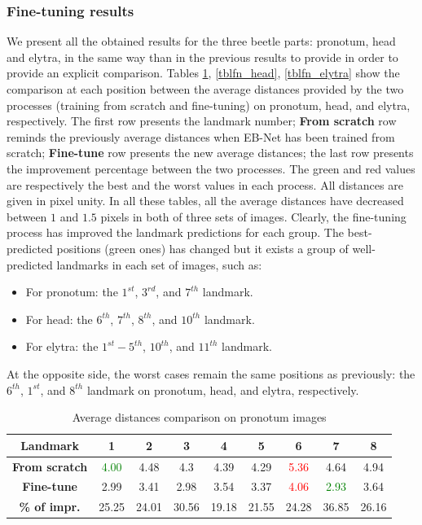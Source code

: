 \documentclass[review]{elsarticle}
\begin{document}
\subsubsection{Fine-tuning results}

We present all the obtained results for the three beetle parts:
pronotum, head and elytra, in the same way than in the previous
results to provide in order to provide an explicit comparison. Tables
\ref{tblfn_pronotum}, \ref{tblfn_head}, \ref{tblfn_elytra} show the
comparison at each position between the average distances provided by
the two processes (training from scratch and fine-tuning) on pronotum,
head, and elytra, respectively.  The first row presents the landmark
number; \textbf{From scratch} row reminds the previously average
distances when EB-Net has been trained from scratch; \textbf{Fine-tune} row
presents the new average distances; the last row presents the
improvement percentage between the two processes. The green and red
values are respectively the best and the worst values in each
process. All distances are given in pixel unity. In all these tables,
all the average distances have decreased between $1$ and $1.5$ pixels
in both of three sets of images. Clearly, the fine-tuning process has
improved the landmark predictions for each group. The best-predicted positions (green
ones) has changed but it exists a group of
well-predicted landmarks in each set of images, such as:


\begin{itemize}
	\item For pronotum: the $1^{st}$, $3^{rd}$, and $7^{th}$ landmark.
	\item For head: the $6^{th}$, $7^{th}$, $8^{th}$, and $10^{th}$ landmark.
	\item For elytra: the $1^{st} - 5 ^{th}$, $10^{th}$, and $11^{th}$ landmark.
\end{itemize}

At the opposite side, the worst cases remain the same positions as previously: the $6^{th}$, $1^{st}$, and $8^{th}$ landmark on pronotum, head, and elytra, respectively.

\begin{table}[h!]
	\centering
	\begin{tabular}{| c || c | c | c | c | c | c | c | c |}
		\hline
		\textbf{Landmark} & 1 & 2 & 3 & 4 & 5 & 6 & 7 & 8 \\ \hline \hline
		\textbf{From scratch} & \textcolor{green}{4.00} & 4.48 & 4.3 & 4.39 & 4.29 & \textcolor{red}{5.36} & 4.64 & 4.94 \\ \hline
		\textbf{Fine-tune} & 2.99 & 3.41 & 2.98 & 3.54 & 3.37 & \textcolor{red}{4.06} & \textcolor{green}{2.93} & 3.64 \\ \hline \hline
		\textbf{\% of impr.} & 25.25 & 24.01 & 30.56 & 19.18 & 21.55 & 24.28 & 36.85 & 26.16 \\ \hline
	\end{tabular}
	\caption{Average distances comparison on pronotum images}
	\label{tblfn_pronotum}
\end{table}
\end{document}
